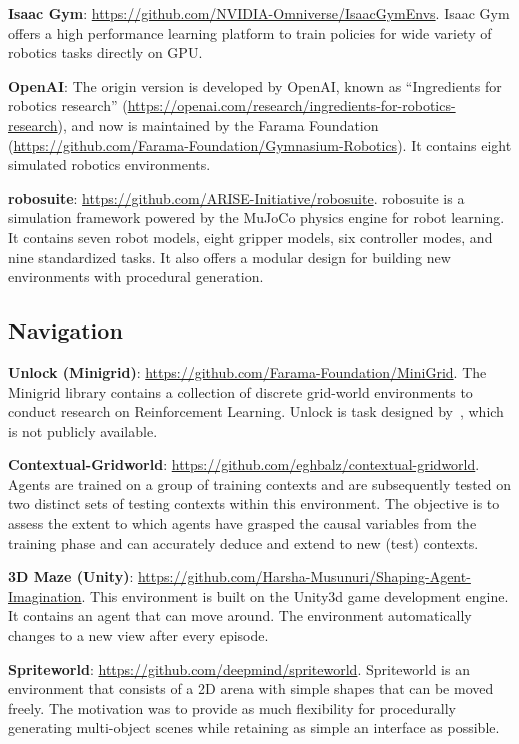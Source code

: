 \documentclass[10pt]{article} %
\theoremstyle{definition}
\begin{document}
\textbf{Isaac Gym}: \url{https://github.com/NVIDIA-Omniverse/IsaacGymEnvs}. Isaac Gym offers a high performance learning platform to train policies for wide variety of robotics tasks directly on GPU.

\textbf{OpenAI}: The origin version is developed by OpenAI, known as ``Ingredients for robotics research'' (\url{https://openai.com/research/ingredients-for-robotics-research}), and now is maintained by the Farama Foundation (\url{https://github.com/Farama-Foundation/Gymnasium-Robotics}). It contains eight simulated robotics environments.

\textbf{robosuite}: \url{https://github.com/ARISE-Initiative/robosuite}. robosuite is a simulation framework powered by the MuJoCo physics engine for robot learning. It contains seven robot models, eight gripper models, six controller modes, and nine standardized tasks. It also offers a modular design for building new environments with procedural generation.

\subsection{Navigation}
\textbf{Unlock (Minigrid)}: \url{https://github.com/Farama-Foundation/MiniGrid}. The Minigrid library contains a collection of discrete grid-world environments to conduct research on Reinforcement Learning. Unlock is task designed by~\citep{dingGeneralizingGoalConditionedReinforcement2022a}, which is not publicly available.

\textbf{Contextual-Gridworld}: \url{https://github.com/eghbalz/contextual-gridworld}. Agents are trained on a group of training contexts and are subsequently tested on two distinct sets of testing contexts within this environment. The objective is to assess the extent to which agents have grasped the causal variables from the training phase and can accurately deduce and extend to new (test) contexts.

\textbf{3D Maze (Unity)}: \url{https://github.com/Harsha-Musunuri/Shaping-Agent-Imagination}. This environment is built on the  Unity3d game development engine. It contains an agent that can move around. The environment automatically changes to a new view after every episode.

\textbf{Spriteworld}: \url{https://github.com/deepmind/spriteworld}. Spriteworld is an environment that consists of a 2D arena with simple shapes that can be moved freely. The motivation was to provide as much flexibility for procedurally generating multi-object scenes while retaining as simple an interface as possible.
\end{document}
